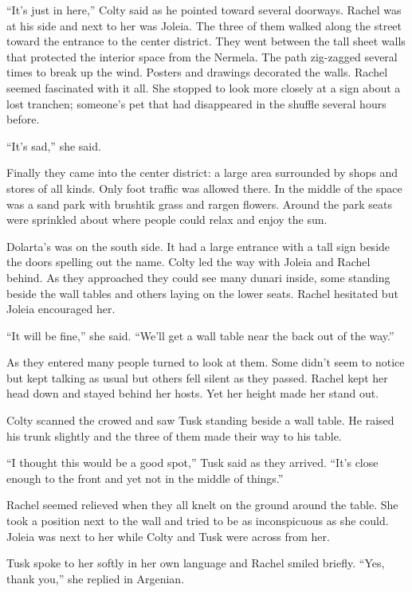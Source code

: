 
``It's just in here,'' Colty said as he pointed toward several doorways. Rachel was at his side
and next to her was Joleia. The three of them walked along the street toward the entrance to the
center district. They went between the tall sheet walls that protected the interior space from
the Nermela. The path zig-zagged several times to break up the wind. Posters and drawings
decorated the walls. Rachel seemed fascinated with it all. She stopped to look more closely at a
sign about a lost tranchen; someone's pet that had disappeared in the shuffle several hours
before.

``It's sad,'' she said.

Finally they came into the center district: a large area surrounded by shops and stores of all
kinds. Only foot traffic was allowed there. In the middle of the space was a sand park with
brushtik grass and rargen flowers. Around the park seats were sprinkled about where people could
relax and enjoy the sun.

Dolarta's was on the south side. It had a large entrance with a tall sign beside the doors
spelling out the name. Colty led the way with Joleia and Rachel behind. As they approached they
could see many dunari inside, some standing beside the wall tables and others laying on the
lower seats. Rachel hesitated but Joleia encouraged her.

``It will be fine,'' she said. ``We'll get a wall table near the back out of the way.''

As they entered many people turned to look at them. Some didn't seem to notice but kept talking
as usual but others fell silent as they passed. Rachel kept her head down and stayed behind her
hosts. Yet her height made her stand out.

Colty scanned the crowed and saw Tusk standing beside a wall table. He raised his trunk slightly
and the three of them made their way to his table.

``I thought this would be a good spot,'' Tusk said as they arrived. ``It's close enough to the
front and yet not in the middle of things.''

Rachel seemed relieved when they all knelt on the ground around the table. She took a position
next to the wall and tried to be as inconspicuous as she could. Joleia was next to her while
Colty and Tusk were across from her.

Tusk spoke to her softly in her own language and Rachel smiled briefly. ``Yes, thank you,'' she
replied in Argenian.

